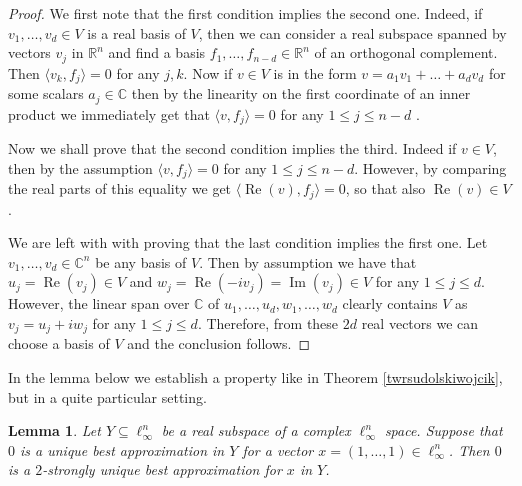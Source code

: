 \documentclass[12pt, reqno]{amsart}
\newtheorem{lem}[twr]{Lemma}
\theoremstyle{definition}
\theoremstyle{remark}
\numberwithin{equation}{section}
\DeclareMathOperator{\re}{Re}
\DeclareMathOperator{\im}{Im}
\begin{document}
\vskip 0.2in

\begin{proof}
We first note that the first condition implies the second one. Indeed, if $v_1, \ldots, v_d \in V$ is a real basis of $V$, then we can consider a real subspace spanned by vectors $v_j$ in $\mathbb{R}^n$ and find a basis $f_1, \ldots, f_{n-d} \in \mathbb{R}^n$ of an orthogonal complement. Then $\langle v_k, f_j \rangle = 0$ for any $j, k$. Now if $v \in V$ is in the form $v = a_1v_1 + \ldots + a_dv_d$ for some scalars $a_j \in \mathbb{C}$ then by the linearity on the first coordinate of an inner product we immediately get that $\langle v, f_j \rangle = 0$ for any $1 \leq j \leq n-d$ .

Now we shall prove that the second condition implies the third. Indeed if $v \in V$, then by the assumption $\langle v, f_j \rangle = 0 $ for any $1 \leq j \leq n-d$. However, by comparing the real parts of this equality we get $\langle \re(v), f_j \rangle = 0$, so that also $\re(v) \in V$.

We are left with with proving that the last condition implies the first one. Let $v_1, \ldots, v_d \in \mathbb{C}^n$ be any basis of $V$. Then by assumption we have that $u_j=\re(v_j) \in V$ and $w_j=\re(-i v_j) = \im(v_j) \in V$ for any $1 \leq j \leq d$. However, the linear span over $\mathbb{C}$ of $u_1, \ldots, u_d, w_1, \ldots, w_d$ clearly contains $V$ as $v_j = u_j + i w_j$ for any $1 \leq j \leq d$. Therefore, from these $2d$ real vectors we can choose a basis of $V$ and the conclusion follows.

\end{proof}

In the lemma below we establish a property like in Theorem \ref{twrsudolskiwojcik}, but in a quite particular setting.

\begin{lem}
\label{lem1}
Let $Y \subseteq \ell_{\infty}^n$ be a real subspace of a complex $\ell_{\infty}^n$ space. Suppose that $0$ is a unique best approximation in $Y$ for a vector $x=(1, \ldots, 1) \in \ell_{\infty}^n$. Then $0$ is a $2$-strongly unique best approximation for $x$ in $Y$.
\end{lem}
\end{document}
